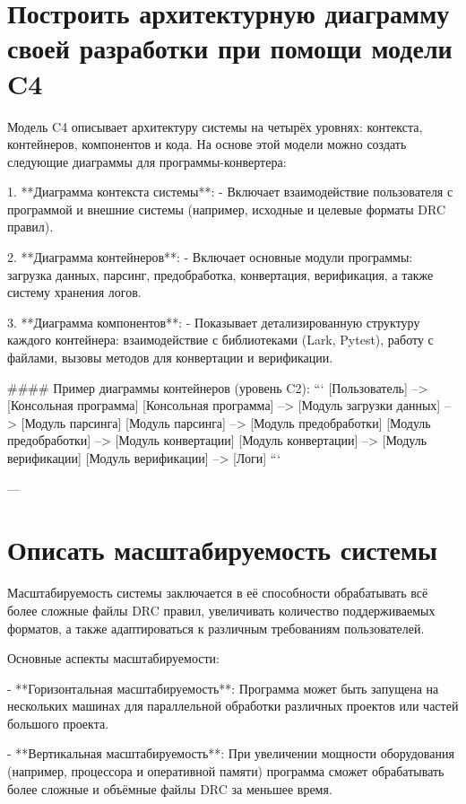 \section{Построить архитектурную диаграмму своей разработки
	при помощи модели C4}

Модель C4 описывает архитектуру системы на четырёх уровнях:
контекста, контейнеров, компонентов и кода.
На основе этой модели можно создать следующие диаграммы
для программы-конвертера:

1. **Диаграмма контекста системы**:
   - Включает взаимодействие пользователя с программой и внешние системы (например, исходные и целевые форматы DRC правил).
   
2. **Диаграмма контейнеров**:
   - Включает основные модули программы: загрузка данных, парсинг, предобработка, конвертация, верификация, а также систему хранения логов.
   
3. **Диаграмма компонентов**:
   - Показывает детализированную структуру каждого контейнера: взаимодействие с библиотеками (Lark, Pytest), работу с файлами, вызовы методов для конвертации и верификации.

#### Пример диаграммы контейнеров (уровень C2):
```
[Пользователь] --> [Консольная программа]
[Консольная программа] --> [Модуль загрузки данных] --> [Модуль парсинга]
[Модуль парсинга] --> [Модуль предобработки]
[Модуль предобработки] --> [Модуль конвертации]
[Модуль конвертации] --> [Модуль верификации]
[Модуль верификации] --> [Логи]
```

---

\section{Описать масштабируемость системы}

Масштабируемость системы заключается в её способности обрабатывать
всё более сложные файлы DRC правил,
увеличивать количество поддерживаемых форматов,
а также адаптироваться к различным требованиям пользователей.

Основные аспекты масштабируемости:

- **Горизонтальная масштабируемость**: Программа может быть запущена на нескольких машинах для параллельной обработки различных проектов или частей большого проекта.
  
- **Вертикальная масштабируемость**: При увеличении мощности оборудования (например, процессора и оперативной памяти) программа сможет обрабатывать более сложные и объёмные файлы DRC за меньшее время.
  
